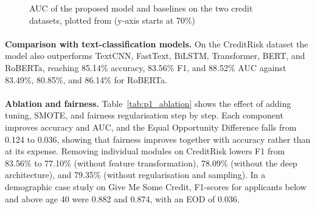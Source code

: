 \documentclass[12pt,a4paper,final]{extreport}
\begin{document}
\begin{figure}[htbp]
\centering
{}
\caption{AUC of the proposed model and baselines on the two credit datasets, plotted from \cite{p1} (y-axis starts at 70\%)}
\label{fig:p1_chart}
\end{figure}

\paragraph{} \textbf{Comparison with text-classification models.} On the CreditRisk dataset the model also outperforms TextCNN, FastText, BiLSTM, Transformer, BERT, and RoBERTa, reaching 85.14\% accuracy, 83.56\% F1, and 88.52\% AUC against 83.49\%, 80.85\%, and 86.14\% for RoBERTa.

\paragraph{} \textbf{Ablation and fairness.} Table~\ref{tab:p1_ablation} shows the effect of adding tuning, SMOTE, and fairness regularisation step by step. Each component improves accuracy and AUC, and the Equal Opportunity Difference falls from 0.124 to 0.036, showing that fairness improves together with accuracy rather than at its expense. Removing individual modules on CreditRisk lowers F1 from 83.56\% to 77.10\% (without feature transformation), 78.09\% (without the deep architecture), and 79.35\% (without regularisation and sampling). In a demographic case study on Give Me Some Credit, F1-scores for applicants below and above age 40 were 0.882 and 0.874, with an EOD of 0.036.
\end{document}
